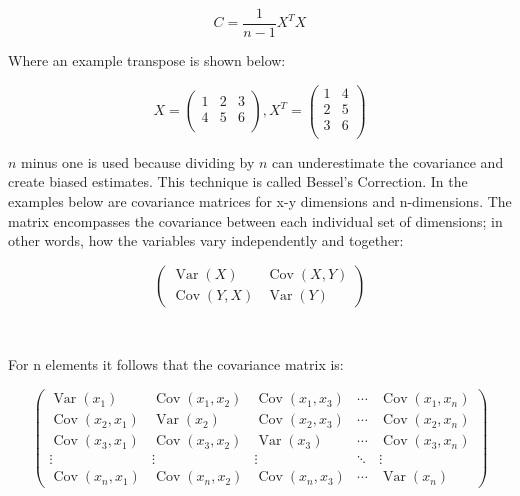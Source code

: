 \documentclass{article}
\begin{document}
\begin{equation*}
C = \frac{1}{n-1} X^T X
\end{equation*}

Where an example transpose is shown below:

\begin{equation*}
   X= \begin{pmatrix}
        \operatorname{1} & \operatorname{2} & \operatorname{3} \\
        \operatorname{4} & \operatorname{5} & \operatorname{6} \\
    \end{pmatrix} , 
    X^T= \begin{pmatrix}
        \operatorname{1} & \operatorname{4} \\
       \operatorname{2}  & \operatorname{5} \\
        \operatorname{3} & \operatorname{6} \\
        \end{pmatrix}
\end{equation*}

$n$ minus one is used because dividing by $n$ can underestimate the covariance and create biased estimates. This technique is called Bessel's Correction. In the examples below are covariance matrices for x-y dimensions and n-dimensions. The matrix encompasses the covariance between each individual set of dimensions; in other words, how the variables vary independently and together:

\begin{equation*}
\begin{pmatrix}
\operatorname{Var}(X) & \operatorname{Cov}(X,Y) \\
\operatorname{Cov}(Y,X) & \operatorname{Var}(Y)
\end{pmatrix}
\end{equation*}

\

For n elements it follows that the covariance matrix is:

\begin{equation*}
\begin{pmatrix}
\operatorname{Var}(x_1) & \operatorname{Cov}(x_1, x_2) & \operatorname{Cov}(x_1, x_3) & \cdots & \operatorname{Cov}(x_1, x_n) \\
\operatorname{Cov}(x_2, x_1) & \operatorname{Var}(x_2) & \operatorname{Cov}(x_2, x_3) & \cdots & \operatorname{Cov}(x_2, x_n) \\
\operatorname{Cov}(x_3, x_1) & \operatorname{Cov}(x_3, x_2) & \operatorname{Var}(x_3) & \cdots & \operatorname{Cov}(x_3, x_n) \\
\vdots & \vdots & \vdots & \ddots & \vdots \\
\operatorname{Cov}(x_n, x_1) & \operatorname{Cov}(x_n, x_2) & \operatorname{Cov}(x_n, x_3) & \cdots & \operatorname{Var}(x_n)
\end{pmatrix}
\end{equation*}
\end{document}

